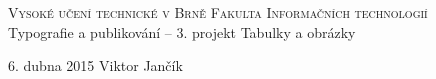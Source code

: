 \begin{titlepage}
\begin{center}
\linespread{0.9}
\Huge
\textsc{\Huge Vysoké učení technické v Brně \linebreak \huge Fakulta Informačních technologií} \\
{\LARGE Typografie a publikování -- 3. projekt \linebreak
\Huge Tabulky a obrázky}
\end{center}
{\Large 6. dubna 2015 \hfill
Viktor Jančík}
\end{titlepage}